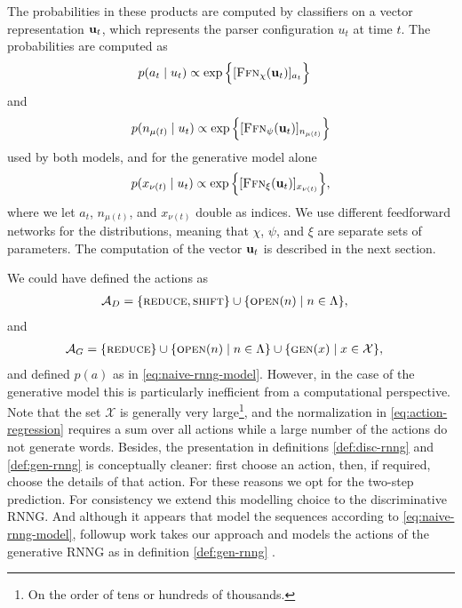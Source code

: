     The probabilities in these products are computed by classifiers on a vector representation $\mathbf{u}_t$, which represents the parser configuration $u_t$ at time $t$. The probabilities are computed as
    \begin{align}
      p(a_t \mid u_{t})
        &\propto \exp \Big\{ [\textsc{Ffn}_{\chi}( \mathbf{u}_t )]_{a_t}  \Big\}
    \end{align}
    and
    \begin{align}
      p(n_{\mu(t)} \mid u_{t}) \propto \exp \Big\{ [\textsc{Ffn}_{\psi}( \mathbf{u}_t )]_{n_{\mu(t)}}  \Big\}
    \end{align}
    used by both models, and for the generative model alone
    \begin{align}
      p(x_{\nu(t)} \mid u_{t}) \propto \exp \Big\{ [\textsc{Ffn}_{\xi}( \mathbf{u}_t )]_{x_{\nu(t)}}  \Big\},
      \label{eq:action-regression}
    \end{align}
    where we let $a_t$, $n_{\mu(t)}$, and $x_{\nu(t)}$ double as indices. We use different feedforward networks for the distributions, meaning that $\chi$, $\psi$, and $\xi$ are separate sets of parameters. The computation of the vector $\mathbf{u}_t$ is described in the next section.

    \begin{remark} We could have defined the actions as
      \begin{align*}
        \mathcal{A}_D &= \{ \textsc{reduce}, \textsc{shift} \} \cup \{ \textsc{open}(n) \mid n \in \Lambda \},
      \end{align*}
      and
      \begin{align*}
        \mathcal{A}_G &= \{ \textsc{reduce} \} \cup \{ \textsc{open}(n) \mid n \in \Lambda \} \cup \{ \textsc{gen}(x) \mid x \in \mathcal{X} \},
      \end{align*}
      and defined $p(a)$ as in \ref{eq:naive-rnng-model}. However, in the case of the generative model this is particularly inefficient from a computational perspective. Note that the set $\mathcal{X}$ is generally very large\footnote{On the order of tens or hundreds of thousands.}, and the normalization in \ref{eq:action-regression} requires a sum over all actions while a large number of the actions do not generate words. Besides, the presentation in definitions \ref{def:disc-rnng} and \ref{def:gen-rnng} is conceptually cleaner: first choose an action, then, if required, choose the details of that action. For these reasons we opt for the two-step prediction. For consistency we extend this modelling choice to the discriminative RNNG. And although it appears that \citet{dyer2016rnng} model the sequences according to \ref{eq:naive-rnng-model}, followup work takes our approach and models the actions of the generative RNNG as in definition \ref{def:gen-rnng} \citep{hale2018beam}.
    \end{remark}

